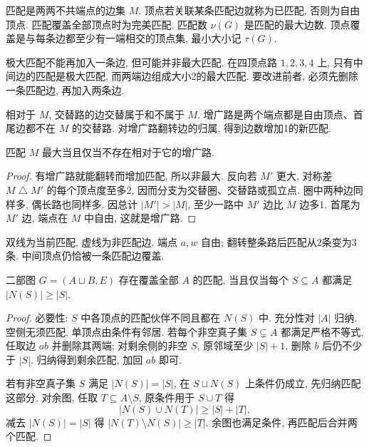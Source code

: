 \label{ch:matching}
\begin{definition}
匹配是两两不共端点的边集 $M$. 顶点若关联某条匹配边就称为已匹配, 否则为自由顶点. 匹配覆盖全部顶点时为完美匹配. 匹配数 $\nu(G)$ 是匹配的最大边数. 顶点覆盖是与每条边都至少有一端相交的顶点集, 最小大小记 $\tau(G)$.
\end{definition}
极大匹配不能再加入一条边, 但可能并非最大匹配. 在四顶点路 $1,2,3,4$ 上, 只有中间边的匹配是极大匹配, 而两端边组成大小2的最大匹配. 要改进前者, 必须先删除一条匹配边, 再加入两条边.
\begin{definition}
相对于 $M$, 交替路的边交替属于和不属于 $M$. 增广路是两个端点都是自由顶点、首尾边都不在 $M$ 的交替路. 对增广路翻转边的归属, 得到边数增加1的新匹配.
\end{definition}
\begin{theorem}[Berge 判据]\label{thm:berge}
匹配 $M$ 最大当且仅当不存在相对于它的增广路.
\end{theorem}
\begin{proof}
有增广路就能翻转而增加匹配, 所以非最大. 反向若 $M'$ 更大, 对称差 $M\mathbin\triangle M'$ 的每个顶点度至多2, 因而分支为交替圈、交替路或孤立点. 圈中两种边同样多, 偶长路也同样多. 因总计 $|M'|>|M|$, 至少一路中 $M'$ 边比 $M$ 边多1. 首尾为 $M'$ 边, 端点在 $M$ 中自由, 这就是增广路.
\end{proof}
\begin{center}
\end{center}
双线为当前匹配, 虚线为非匹配边. 端点 $a,w$ 自由; 翻转整条路后匹配从2条变为3条. 中间顶点仍恰被一条匹配边覆盖.
\begin{theorem}[Hall]\label{thm:hall}
二部图 $G=(A\sqcup B,E)$ 存在覆盖全部 $A$ 的匹配, 当且仅当每个 $S\subseteq A$ 都满足 $|N(S)|\ge|S|$.
\end{theorem}
\begin{proof}
必要性: $S$ 中各顶点的匹配伙伴不同且都在 $N(S)$ 中. 充分性对 $|A|$ 归纳. 空侧无须匹配, 单顶点由条件有邻居. 若每个非空真子集 $S\subsetneq A$ 都满足严格不等式, 任取边 $ab$ 并删除其两端; 对剩余侧的非空 $S$, 原邻域至少 $|S|+1$, 删除 $b$ 后仍不少于 $|S|$. 归纳得到剩余匹配, 加回 $ab$ 即可.

若有非空真子集 $S$ 满足 $|N(S)|=|S|$, 在 $S\sqcup N(S)$ 上条件仍成立, 先归纳匹配这部分. 对余图, 任取 $T\subseteq A\setminus S$, 原条件用于 $S\cup T$ 得
\[
|N(S)\cup N(T)|\ge |S|+|T|,
\]
减去 $|N(S)|=|S|$ 得 $|N(T)\setminus N(S)|\ge|T|$. 余图也满足条件, 再匹配后合并两个匹配.
\end{proof}
